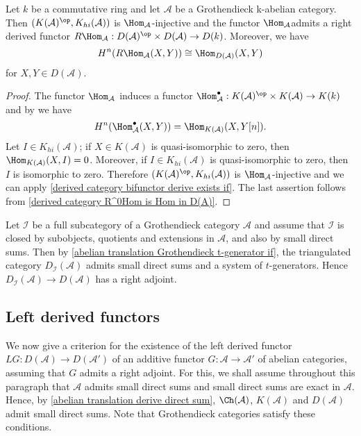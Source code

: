 \begin{corollary}\label{abelian Grothendieck unbounded derived category RHom}
Let $k$ be a commutative ring and let $\mathcal{A}$ be a Grothendieck
k-abelian category. Then $(K(\mathcal{A})^{\op},K_{hi}(\mathcal{A}))$ is $\Hom_{\mathcal{A}}$-injective and the functor $\Hom_\mathcal{A} $admits a right derived functor $R\Hom_\mathcal{A}:D(\mathcal{A})^{\op}\times D(\mathcal{A})\to D(k)$. Moreover, we have
\[H^n(R\Hom_\mathcal{A}(X,Y))\cong \Hom_{D(\mathcal{A})}(X,Y)\]
for $X,Y\in D(\mathcal{A})$.
\end{corollary}
\begin{proof}
The functor $\Hom_\mathcal{A}$ induces a functor $\Hom_\mathcal{A}^\bullet:K(\mathcal{A})^{\op}\times K(\mathcal{A})\to K(k)$ and by \cite[proposition 11.7.3]{kashiwara_SAC} we have
\[H^n(\Hom_\mathcal{A}^\bullet(X,Y))=\Hom_{K(\mathcal{A})}(X,Y[n]).\]
Let $I\in K_{hi}(\mathcal{A})$; if $X\in K(\mathcal{A})$ is quasi-isomorphic to zero, then $\Hom_{K(\mathcal{A})}(X,I)=0$. Moreover, if $I\in K_{hi}(\mathcal{A})$ is quasi-isomorphic to zero, then $I$ is isomorphic to zero. Therefore $(K(\mathcal{A})^{\op},K_{hi}(\mathcal{A}))$ is $\Hom_{\mathcal{A}}$-injective and we can apply \cref{derived category bifunctor derive exists if}. The last assertion follows from \cref{derived category R^0Hom is Hom in D(A)}.
\end{proof}

\begin{remark}
Let $\mathcal{I}$ be a full subcategory of a Grothendieck category $\mathcal{A}$ and assume that $\mathcal{I}$ is closed by subobjects, quotients and extensions in $\mathcal{A}$, and also by small direct sums. Then by \cref{abelian translation Grothendieck t-generator if}, the triangulated category $D_\mathcal{I}(\mathcal{A})$ admits small direct sums and a system of $t$-generators. Hence $D_\mathcal{I}(\mathcal{A})\to D(\mathcal{A})$ has a right adjoint.
\end{remark}

\subsection{Left derived functors}
We now give a criterion for the existence of the left derived functor $LG:D(\mathcal{A})\to D(\mathcal{A}')$ of an additive functor $G:\mathcal{A}\to\mathcal{A}'$ of abelian categories, assuming that $G$ admits a right adjoint. For this, we shall assume throughout this paragraph that $\mathcal{A}$ admits small direct sums and small direct sums are exact in $\mathcal{A}$. Hence, by \cref{abelian translation derive direct sum}, $\Ch(\mathcal{A})$, $K(\mathcal{A})$ and $D(\mathcal{A})$ admit small direct sums. Note that Grothendieck categories satisfy these conditions.

